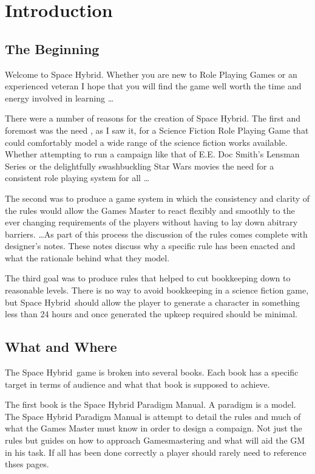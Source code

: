 \chapter{Introduction}

\section{The Beginning}

Welcome to Space Hybrid. Whether you are new to Role Playing Games 
or an experienced veteran I hope that you will find the game well
worth the time and energy involved in learning \dots

There were a number of reasons for the creation of Space Hybrid. The 
first and foremost was the need , as I saw it, for a Science 
Fiction Role Playing Game that could comfortably model a wide range
of the science fiction works available. Whether attempting to run 
a campaign like that of E.E. Doc Smith's Lensman Series or the 
delightfully swashbuckling {Star Wars} movies the need for a consistent
role playing system for all \dots

The second was to produce a game system in which the consistency 
and clarity of the rules would allow the Games Master to 
react flexibly and smoothly to the ever changing requirements
of the players without having to lay down abitrary barriers.
\dots As part of this process the discussion of the rules comes 
complete with designer's notes. These notes discuss why a 
specific rule has been enacted and what the rationale behind 
what they model. 

The third goal was to produce rules that helped to cut
bookkeeping down to reasonable levels. There is no way to avoid 
bookkeeping in a science fiction game, but Space Hybrid\ should 
allow the player to generate a character in something less than 24 
hours and once generated the upkeep required should be minimal.


\section{What and Where}
The Space Hybrid\ game is broken into several books. Each book has
a specific target in terms of audience and what that book is supposed 
to achieve.

The first book is the Space Hybrid Paradigm Manual. A paradigm is a model.
The Space Hybrid Paradigm Manual is attempt to detail the rules and 
much of what the Games Master must know in order to design a compaign. 
Not just the rules but guides on how to approach Gamesmastering and what will aid the 
GM in his task. If all has been done correctly a player should rarely need to reference 
thses pages.

